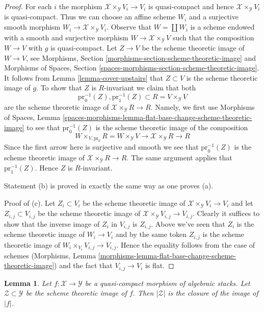 \documentclass{stacks-project}
\theoremstyle{plain}
\newtheorem{lemma}[subsection]{Lemma}
\theoremstyle{definition}
\theoremstyle{remark}
\numberwithin{equation}{subsection}
\begin{document}
\begin{proof}
\medskip\noindent
For each $i$ the morphism $\mathcal{X} \times_\mathcal{Y} V_i \to V_i$
is quasi-compact and hence $\mathcal{X} \times_\mathcal{Y} V_i$ is
quasi-compact. Thus we can choose an affine scheme $W_i$ and a
surjective smooth morphism $W_i \to \mathcal{X} \times_\mathcal{Y} V_i$.
Observe that $W = \coprod W_i$ is a scheme endowed with
a smooth and surjective morphism $W \to \mathcal{X} \times_\mathcal{Y} V$
such that the composition $W \to V$ with $g$ is quasi-compact.
Let $Z \to V$ be the scheme theoretic image of $W \to V$, see
Morphisms, Section
\ref{morphisms-section-scheme-theoretic-image} and
Morphisms of Spaces, Section
\ref{spaces-morphisms-section-scheme-theoretic-image}.
It follows from Lemma \ref{lemma-cover-upstairs}
that $Z \subset V$ is the scheme theoretic image of $g$.
To show that $Z$ is $R$-invariant we claim that both
$$
\text{pr}_0^{-1}(Z), \text{pr}_1^{-1}(Z) \subset R = V \times_\mathcal{Y} V
$$
are the scheme theoretic image of $\mathcal{X} \times_\mathcal{Y} R \to R$.
Namely, we first use Morphisms of Spaces, Lemma
\ref{spaces-morphisms-lemma-flat-base-change-scheme-theoretic-image}
to see that $\text{pr}_0^{-1}(Z)$ is the scheme theoretic image
of the composition
$$
W \times_{V, \text{pr}_0} R = W \times_\mathcal{Y} V \to
\mathcal{X} \times_\mathcal{Y} R \to R
$$
Since the first arrow here is surjective and smooth we see that
$\text{pr}_0^{-1}(Z)$ is the scheme theoretic image of
$\mathcal{X} \times_\mathcal{Y} R \to R$. The same argument applies
that $\text{pr}_1^{-1}(Z)$. Hence $Z$ is $R$-invariant.

\medskip\noindent
Statement (b) is proved in exactly the same way as one proves (a).

\medskip\noindent
Proof of (c). Let $Z_i \subset V_i$ be the scheme theoretic image
of $\mathcal{X} \times_\mathcal{Y} V_i \to V_i$ and let
$Z_{i, j} \subset V_{i, j}$ be the scheme theoretic image of
$\mathcal{X} \times_\mathcal{Y} V_{i, j} \to V_{i, j}$.
Clearly it suffices to show that the inverse image of $Z_i$
in $V_{i, j}$ is $Z_{i, j}$. Above we've seen that
$Z_i$ is the scheme theoretic image of $W_i \to V_i$
and by the same token $Z_{i, j}$ is the scheme theoretic
image of $W_i \times_{V_i} V_{i, j} \to V_{i, j}$.
Hence the equality follows from the case of schemes
(Morphisms, Lemma
\ref{morphisms-lemma-flat-base-change-scheme-theoretic-image})
and the fact that $V_{i, j} \to V_i$ is flat.
\end{proof}

\begin{lemma}
\label{lemma-topology-scheme-theoretic-image}
Let $f : \mathcal{X} \to \mathcal{Y}$ be a quasi-compact
morphism of algebraic stacks. Let $\mathcal{Z} \subset \mathcal{Y}$
be the scheme theoretic image of $f$. Then $|\mathcal{Z}|$
is the closure of the image of $|f|$.
\end{lemma}
\end{document}

